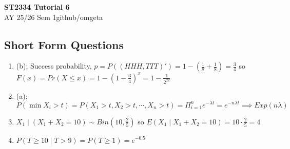 \documentclass[12pt, a4paper]{article}
\newcommand{\mytitle}{ST2334 Tutorial 6}
\newcommand{\myauthor}{github/omgeta}
\newcommand{\mydate}{AY 25/26 Sem 1}
\begin{document}
\raggedright
\footnotesize
\begin{center}
{\normalsize{\textbf{\mytitle}}} \\
{\footnotesize{\mydate\hspace{2pt}\textemdash\hspace{2pt}\myauthor}}
\end{center}
\subsection*{Short Form Questions}
\begin{enumerate}[Q\arabic*.]
  \item (b); Success probability, $p = P((HHH, TTT)') = 1 - (\frac{1}{8} + \frac{1}{8}) = \frac{3}{4}$ so $F(x) = Pr(X \leq x) = 1 - (1- \frac{3}{4})^x = 1- \frac{1}{2^{2x}}$

  \item (a); $P(\min X_i > t) = P(X_1 > t, X_2 > t, \cdots, X_n > t) = \Pi^n_{i=1}e^{-\lambda t} = e^{-n\lambda t} \implies Exp(n\lambda)$

  \item $X_1 \mid (X_1 + X_2 = 10) \sim Bin(10, \frac{2}{5})$ so $E(X_1 \mid X_1+X_2=10) = 10 \cdot \frac{2}{5} = 4$ 

  \item $P(T \geq 10 \mid T > 9)= P(T \geq 1) = e^{-0.5}$
\end{enumerate}
\end{document}
